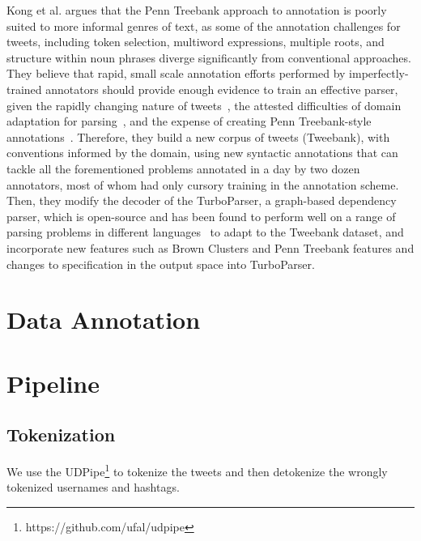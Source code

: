 \documentclass[11pt,letterpaper]{article}
\begin{document}
Kong et al.  argues that the Penn Treebank approach to annotation is poorly suited to more informal genres of text, as some of the annotation challenges for tweets,
including token selection, multiword expressions, multiple roots, and structure within noun phrases diverge significantly from conventional approaches. 
They believe that rapid, small scale annotation efforts performed by imperfectly-trained annotators should provide enough evidence to train an effective parser, given the rapidly changing nature of tweets~\cite{eisenstein:2013:NAACL-HLT}, the attested difficulties of domain adaptation for parsing~\cite{dred07}, and the expense of creating Penn Treebank-style annotations~\cite{penn93}. 
Therefore, they build a new corpus of tweets (Tweebank), with conventions informed by the domain, using new syntactic annotations that can tackle all the forementioned problems annotated in a day by two dozen annotators, most of whom had only cursory training in the annotation scheme. Then, they modify the decoder of the TurboParser, a graph-based dependency parser, which is open-source and has been found to perform well on a range of parsing problems in different languages~\cite{turbo13} to adapt to the Tweebank dataset, and incorporate new features such as Brown Clusters and Penn Treebank features and changes to specification
in the output space into TurboParser.


\section{Data Annotation}
\subsection{}



\section{Pipeline}
\subsection{Tokenization}
We use the UDPipe\footnote{https://github.com/ufal/udpipe} to tokenize the tweets and then detokenize the wrongly tokenized usernames and hashtags.
\end{document}
